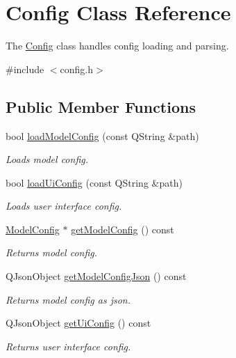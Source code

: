 \hypertarget{class_config}{}\section{Config Class Reference}
\label{class_config}


The \mbox{\hyperlink{class_config}{Config}} class handles config loading and parsing.  




{\ttfamily \#include $<$config.\+h$>$}

\subsection*{Public Member Functions}
\begin{DoxyCompactItemize}
\item 
bool \mbox{\hyperlink{class_config_aeafd352da1f8e8596038fba4ffc8ce35}{load\+Model\+Config}} (const Q\+String \&path)
\begin{DoxyCompactList}\small\item\em Loads model config. \end{DoxyCompactList}\item 
bool \mbox{\hyperlink{class_config_af74ffa7c4476a31403415a11a6cf1108}{load\+Ui\+Config}} (const Q\+String \&path)
\begin{DoxyCompactList}\small\item\em Loads user interface config. \end{DoxyCompactList}\item 
\mbox{\hyperlink{struct_model_config}{Model\+Config}} $\ast$ \mbox{\hyperlink{class_config_a1ff780b4fbdf6f7e432e11f2490c1b56}{get\+Model\+Config}} () const
\begin{DoxyCompactList}\small\item\em Returns model config. \end{DoxyCompactList}\item 
Q\+Json\+Object \mbox{\hyperlink{class_config_a7a137547a3757056c6dea9f93945c417}{get\+Model\+Config\+Json}} () const
\begin{DoxyCompactList}\small\item\em Returns model config as json. \end{DoxyCompactList}\item 
Q\+Json\+Object \mbox{\hyperlink{class_config_ab3828a5d249dc41d32da68fd9048c4fd}{get\+Ui\+Config}} () const
\begin{DoxyCompactList}\small\item\em Returns user interface config. \end{DoxyCompactList}\end{DoxyCompactItemize}
